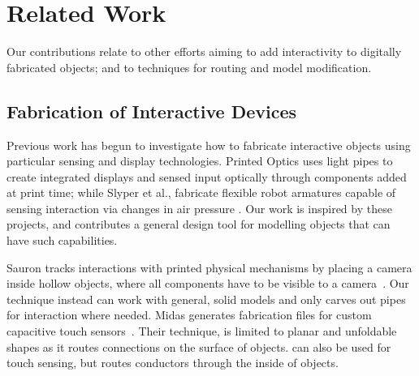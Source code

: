 \section{Related Work}
Our contributions relate to other efforts aiming to add interactivity to digitally fabricated objects; and to techniques for routing and model modification.  

\subsection{Fabrication of Interactive Devices}

Previous work has begun to investigate how to fabricate interactive objects using particular sensing and display technologies. Printed Optics \cite{Willis-printedoptics} uses light pipes to create integrated displays and sensed input optically through components added at print time; while Slyper et al., fabricate flexible robot armatures capable of sensing interaction via changes in air pressure \cite{Slyper-pressure}. Our work is inspired by these projects, and contributes a general design tool for modelling objects that can have such capabilities.  

Sauron tracks interactions with printed physical mechanisms by placing a camera inside hollow objects, where all components have to be visible to a camera~\cite{Savage-sauron}.  Our technique instead can work with general, solid models and only carves out pipes for interaction where needed. Midas generates fabrication files for custom capacitive touch sensors~\cite{Savage-midas}.  Their technique, is limited to planar and unfoldable shapes as it routes connections on the surface of objects. \systemname can also be used for touch sensing, but routes conductors through the inside of objects.


